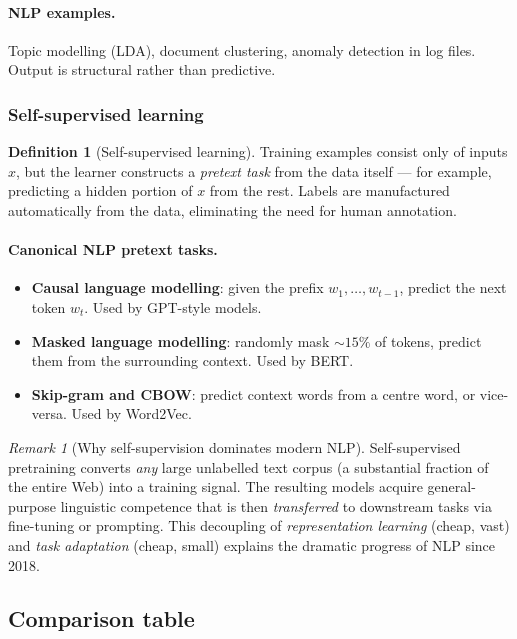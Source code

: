 \documentclass[12pt,a4paper]{report}
\theoremstyle{definition}
\newtheorem{definition}{Definition}[section]
\theoremstyle{remark}
\newtheorem{remark}{Remark}[section]
\begin{document}
\paragraph{NLP examples.} Topic modelling (LDA), document clustering, anomaly detection in log files. Output is structural rather than predictive.

\subsubsection*{Self-supervised learning}

\begin{definition}[Self-supervised learning]
Training examples consist only of inputs $x$, but the learner constructs a \emph{pretext task} from the data itself --- for example, predicting a hidden portion of $x$ from the rest. Labels are manufactured automatically from the data, eliminating the need for human annotation.
\end{definition}

\paragraph{Canonical NLP pretext tasks.}
\begin{itemize}
    \item \textbf{Causal language modelling}: given the prefix $w_1, \dots, w_{t-1}$, predict the next token $w_t$. Used by GPT-style models.
    \item \textbf{Masked language modelling}: randomly mask $\sim 15\%$ of tokens, predict them from the surrounding context. Used by BERT.
    \item \textbf{Skip-gram and CBOW}: predict context words from a centre word, or vice-versa. Used by Word2Vec.
\end{itemize}

\begin{remark}[Why self-supervision dominates modern NLP]
Self-supervised pretraining converts \emph{any} large unlabelled text corpus (a substantial fraction of the entire Web) into a training signal. The resulting models acquire general-purpose linguistic competence that is then \emph{transferred} to downstream tasks via fine-tuning or prompting. This decoupling of \emph{representation learning} (cheap, vast) and \emph{task adaptation} (cheap, small) explains the dramatic progress of NLP since 2018.
\end{remark}

\subsection{Comparison table}
\end{document}
